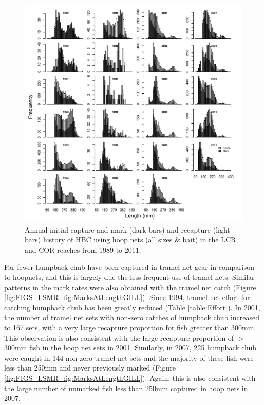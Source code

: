 \begin{figure}[htbp]
	\centering
		\includegraphics[width=6.5in]{../FIGS/LSMR/fig:MarksAtLengthHOOP.pdf}
	\caption{Annual initial-capture and mark (dark bars) and recapture (light bars) history of HBC using hoop nets (all sizes \& bait) in the LCR and COR reaches from 1989 to 2011.}
	\label{fig:FIGS_LSMR_fig:MarksAtLengthHOOP}
\end{figure}

Far fewer humpback chub have been captured in tramel net gear in comparison to hoopnets, and this is largely due the less frequent use of tramel nets.  Similar patterns in the mark rates were also obtained with the tramel net catch (Figure \ref{fig:FIGS_LSMR_fig:MarksAtLengthGILL}).  Since 1994, tramel net effort for catching humpback chub has been greatly reduced (Table \ref{table:Effort}).  In 2001, the number of tramel net sets with non-zero catches of humpback chub increased to 167 sets, with a very large recapture proportion for fish greater than 300mm.  This observation is also consistent with the large recapture proportion of $>$300mm fish in the hoop net sets in 2001.  Similarly, in 2007, 225 humpback chub were caught in 144 non-zero tramel net sets and the majority of these fish were less than 250mm and never previously marked (Figure \ref{fig:FIGS_LSMR_fig:MarksAtLengthGILL}). Again, this is also consistent with the large number of unmarked fish less than 250mm captured in hoop nets in 2007.

